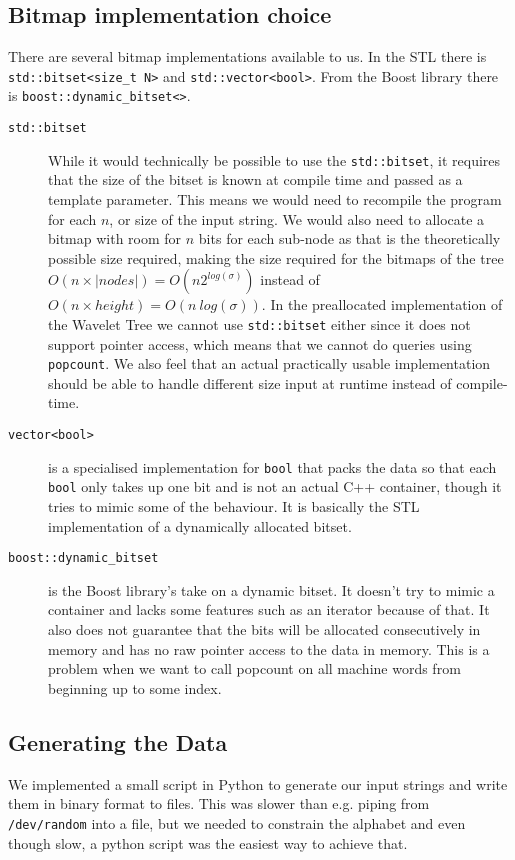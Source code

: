 \subsection{Bitmap implementation choice}
There are several bitmap implementations available to us. In the STL there is \texttt{std::bitset<size\_t N>} and \texttt{std::vector<bool>}. From the Boost library there is \texttt{boost::dynamic\_bitset<>}.
\begin{description}
\item[\texttt{std::bitset}] While it would technically be possible to use the \texttt{std::bitset}, it requires that the size of the bitset is known at compile time and passed as a template parameter. This means we would need to recompile the program for each $n$, or size of the input string. 
We would also need to allocate a bitmap with room for $n$ bits for each sub-node as that is the theoretically possible size required, making the size required for the bitmaps of the tree $O(n \times |nodes|) = O(n2^{log(\sigma)})$ instead of $O(n \times height) = O(n~log(\sigma))$.
In the preallocated implementation of the Wavelet Tree we cannot use \texttt{std::bitset} either since it does not support pointer access, which means that we cannot do queries using \texttt{popcount}.
We also feel that an actual practically usable implementation should be able to handle different size input at runtime instead of compile-time. 

\item[\texttt{vector<bool>}] is a specialised implementation for \texttt{bool} that packs the data so that each \texttt{bool} only takes up one bit and is not an actual C++ container, though it tries to mimic some of the behaviour. 
It is basically the STL implementation of a dynamically allocated bitset.

\item[\texttt{boost::dynamic\_bitset}] is the Boost library's take on a dynamic bitset. 
It doesn't try to mimic a container and lacks some features such as an iterator because of that. 
It also does not guarantee that the bits will be allocated consecutively in memory and has no raw pointer access to the data in memory. 
This is a problem when we want to call popcount on all machine words from beginning up to some index.
\end{description}

\subsection{Generating the Data}
We implemented a small script in Python to generate our input strings and write them in binary format to files.
This was slower than e.g. piping from \texttt{/dev/random} into a file, but we needed to constrain the alphabet and even though slow, a python script was the easiest way to achieve that.


